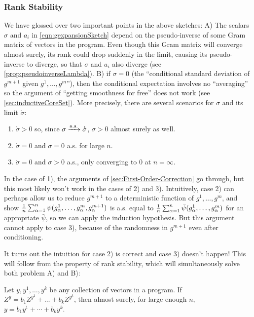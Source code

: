 \documentclass[main.tex]{subfiles}
\begin{document}
\subsubsection{Rank Stability}
\label{sec:rankStability}

We have glossed over two important points in the above sketches:
A) The scalars $\sigma$ and $a_i$ in \cref{eqn:gexpansionSketch} depend on the pseudo-inverse of some Gram matrix of vectors in the program.
Even though this Gram matrix will converge almost surely, its rank could drop suddenly in the limit, causing its pseudo-inverse to diverge, so that $\sigma$ and $a_i$ also diverge (see \cref{prop:pseudoinverseLambda}).
B) if $\sigma=0$ (the ``conditional standard deviation of $g^{m+1}$ given $g^1, \ldots, g^m$''), then the conditional expectation involves no ``averaging'' so the argument of ``getting smoothness for free'' does not work (see \cref{sec:inductiveCoreSet}). More precisely, there are several scenarios for $\sigma$ and its limit $\mathring \sigma$:
\begin{enumerate}
    \item $\mathring{\sigma}>0$ so, since $\sigma\xrightarrow{\mathrm{a.s.}}\mathring{\sigma}$, $\sigma>0$ almost surely as well. 
    \item $\mathring{\sigma}=0$ and $\sigma=0$ a.s. for large $n$.
    \item $\mathring{\sigma}=0$ and $\sigma>0$ a.s., only converging to 0 at $n=\infty$.
\end{enumerate}
In the case of 1), the arguments of \cref{sec:First-Order-Correction} go through, but this most likely won't work in the cases of 2) and 3). Intuitively, case 2) can perhaps allow us to reduce $g^{m+1}$ to a deterministic function of $g^1, \ldots, g^m$, and
show $\frac{1}{n}\sum_{\alpha=1}^{n}\psi(g_{\alpha}^{1},\ldots,g_{\alpha}^{m},g_{\alpha}^{m+1})$ is a.s. equal to $\frac{1}{n}\sum_{\alpha=1}^{n}\bar{\psi}(g_{\alpha}^{1},\ldots,g_{\alpha}^{m})$ for an appropriate $\bar{\psi}$, so we can apply the induction hypothesis. But this argument cannot apply to case 3), because of the randomness in $g^{m+1}$ even after conditioning.

It turns out the intuition for case 2) is correct and case 3) doesn't happen! This will follow from the property of rank stability, which will simultaneously solve both problem A) and B):
\begin{thm}
\label{thm:rankstabilitymain} Let $y,y^{1},\ldots,y^{k}$ be any collection of vectors in a \netsort{} program. If $Z^{y}=b_{1}Z^{y^{1}}+\ldots+b_{k}Z^{y^{k}}$, then almost surely, for large enough $n$, $y=b_{1}y^{1}+\cdots+b_{k}y^{k}$.
\end{thm}
\end{document}
